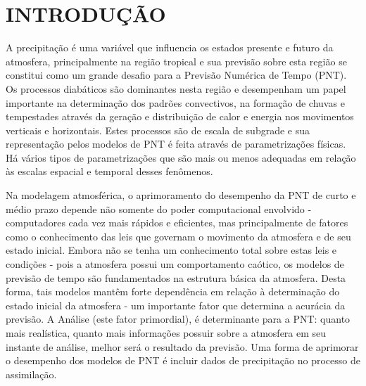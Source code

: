 \hypertarget{estilo:capitulo}{}
\chapter{INTRODUÇÃO} 

A precipitação é uma variável que influencia os estados presente e futuro da atmosfera,  principalmente na região tropical e sua previsão sobre esta região  se constitui como um grande desafio para a Previsão Numérica de Tempo (PNT). Os processos diabáticos são dominantes nesta região e desempenham um papel importante na determinação dos padrões convectivos, na formação de chuvas e tempestades através da geração e distribuição de calor e energia nos movimentos verticais e horizontais. Estes processos são de escala de subgrade e sua representação pelos modelos de PNT é feita através de parametrizações  físicas. Há vários tipos de parametrizações que são mais ou menos adequadas em relação às escalas espacial e temporal desses fenômenos.

Na modelagem atmosférica, o aprimoramento do desempenho da PNT de curto e médio prazo depende não somente do poder computacional envolvido - computadores cada vez mais rápidos e eficientes, mas principalmente de fatores como o conhecimento das leis que governam o movimento da atmosfera e de seu estado inicial. Embora não se tenha um conhecimento total sobre estas leis e condições - pois a atmosfera possui um comportamento caótico, os modelos de previsão de tempo são fundamentados na estrutura básica da atmosfera. Desta forma, tais modelos mantêm forte dependência em relação à determinação do estado inicial da atmosfera - um importante fator que determina a acurácia da previsão. A Análise (este fator primordial), é determinante para a PNT: quanto mais realística, quanto mais informações possuir sobre a atmosfera em seu instante de análise, melhor será o resultado da previsão. Uma forma de aprimorar o desempenho dos modelos de PNT é incluir dados de precipitação no processo de assimilação.


